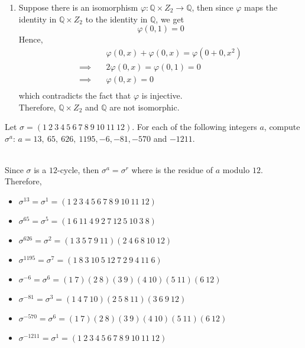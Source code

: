 \begin{solution}
\begin{enumerate}[label=(\alph*)]
        \item Suppose there is an isomorphism $\varphi:\mathbb{Q}
        \times Z_2\to \mathbb{Q}$, then since $\varphi$ maps the identity
        in $\mathbb{Q}\times Z_2$ to the identity in $\mathbb{Q}$, we get
        $$\varphi(0,1) = 0$$
        Hence,
        \begin{align*}
            &\varphi(0,x) + \varphi(0,x) = \varphi(0+0,x^2) \\
            \implies \quad & 2\varphi(0,x) = \varphi(0,1) = 0 \\
            \implies \quad & \varphi(0,x) = 0 \\
        \end{align*}
        which contradicts the fact that $\varphi$ is injective.\\
        Therefore, $\mathbb{Q}\times Z_2$ and $\mathbb{Q}$ are not
        isomorphic.
    \end{enumerate}
\end{solution}

\begin{exercise}
    Let $\sigma = (1\ 2\ 3\ 4\ 5\ 6\ 7\ 8\ 9\ 10\ 11\ 12)$. For each of the
    following integers $a$, compute $\sigma^a$:
    $a=13,\ 65,\ 626,\ 1195,-6,-81,-570$ and $-1211$.\\
\end{exercise}

\begin{solution}
    \\ Since $\sigma$ is a $12$-cycle, then $\sigma^a = \sigma^r$ where
    is the residue of $a$ modulo $12$. Therefore,
    \begin{itemize}
        \item $\sigma^{13} = \sigma^1 = (1\ 2\ 3\ 4\ 5\ 6\ 7\ 8\ 9\ 10\ 11\
        12)$
        \item $\sigma^{65} = \sigma^5 = (1\ 6\ 11\ 4\ 9\ 2\ 7\ 12\ 5\ 10\ 3\
        8)$
        \item $\sigma^{626} = \sigma^2 = (1\ 3\ 5\ 7\ 9\ 11)(2\ 4\ 6\ 8\ 10\
        12)$
        \item $\sigma^{1195} = \sigma^7 = (1\ 8\ 3\ 10\ 5\ 12\ 7\ 2\ 9\ 4\
        11\ 6)$
        \item $\sigma^{-6} = \sigma^6 = (1\ 7)(2\ 8)(3\ 9)(4\ 10)(5\ 11)(6\
        12)$
        \item $\sigma^{-81} = \sigma^3 = (1\ 4\ 7\ 10)(2\ 5\ 8\ 11)(3\ 6\
        9\ 12)$
        \item $\sigma^{-570} = \sigma^6 = (1\ 7)(2\ 8)(3\ 9)(4\ 10)(5\ 11)
        (6\ 12)$
        \item $\sigma^{-1211} = \sigma^1 = (1\ 2\ 3\ 4\ 5\ 6\ 7\ 8\ 9\ 10\
        11\ 12)$
    \end{itemize}
\end{solution}


